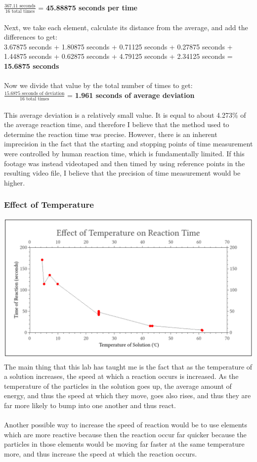 \documentclass[11pt]{article}
\begin{document}
\\
$ \frac{\textrm{367.11 seconds}}{\textrm{16 total times}}$ = \textbf{45.88875 seconds per time} \\
\\
Next, we take each element, calculate its distance from the average, and add the differences to get:
\\
3.67875 seconds + 1.80875 seconds + 0.71125 seconds + 0.27875 seconds + 1.44875 seconds + 0.62875 seconds + 4.79125 seconds + 2.34125 seconds = \textbf{15.6875 seconds}\\
\\
Now we divide that value by the total number of times to get:
\\
$ \frac{\textrm{15.6875 seconds of deviation}}{\textrm{16 total times}}$ = \textbf{1.961 seconds of average deviation} \\
\\
This average deviation is a relatively small value. It is equal to about 4.273\% of the average reaction time, and therefore I believe that the method used to determine the reaction time was precise. However, there is an inherent imprecision in the fact that the starting and stopping points of time measurement were controlled by human reaction time, which is fundamentally limited. If this footage was instead videotaped and then timed by using reference points in the resulting video file, I believe that the precision of time measurement would be higher.  


\subsubsection{Effect of Temperature}

\includegraphics[width=\textwidth]{TempvsTime}\\
The main thing that this lab has taught me is the fact that as the temperature of a solution increases, the speed at which a reaction occurs is increased. As the temperature of the particles in the solution goes up, the average amount of energy, and thus the speed at which they move, goes also rises, and thus they are far more likely to bump into one another and thus react.\\
\\
Another possible way to increase the speed of reaction would be to use elements which are more reactive because then the reaction occur far quicker because the particles in those elements would be moving far faster at the same temperature more, and thus increase the speed at which the reaction occurs.
\end{document}
